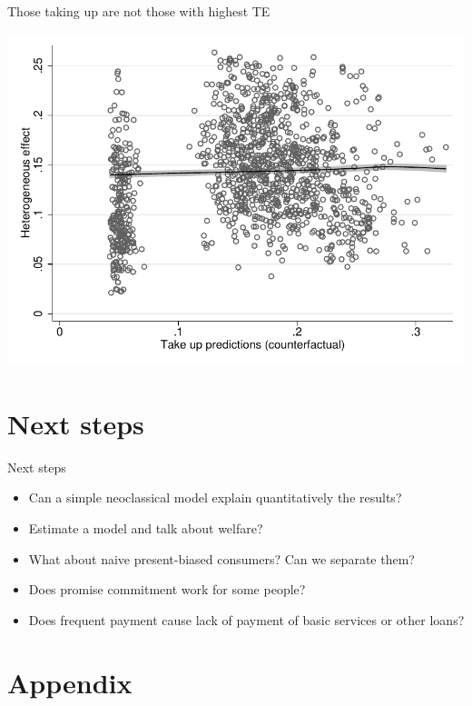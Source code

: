 \documentclass[9pt]{beamer}
\begin{document}
\begin{frame}{Those taking up are not those with highest TE}
    \begin{center}
        \includegraphics[width=.70\textwidth]{Figuras/takeup_he_pro_2_fee.pdf}
    \end{center}
\end{frame}



\section{Next steps}

\begin{frame}{Next steps}

\begin{itemize}
    \item Can a simple neoclassical model explain quantitatively the results?
    \vfill
    \item Estimate a model and talk about welfare?
    \vfill
    \item What about naive present-biased consumers? Can we separate them?
    \vfill
    \item Does promise commitment work for some people?
    \vfill
    \item Does frequent payment cause lack of payment of basic services or other loans?
\end{itemize}
    
\end{frame}



\section{Appendix}
\end{document}
